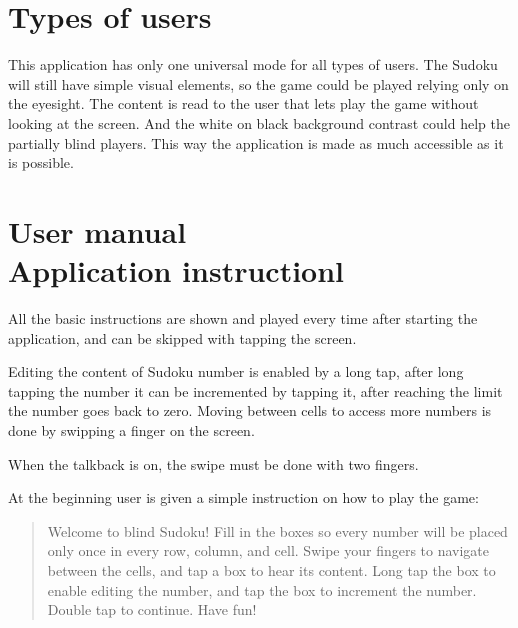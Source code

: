 \documentclass[a4paper,twoside,12pt]{book}
\begin{document}
\section{Types of users}

\par This application has only one universal mode for all types of users. The Sudoku will still have simple visual elements, so the game could be played relying only on the eyesight. The content is read to the user that lets play the game without looking at the screen. And the white on black background contrast could help the partially blind players. This way the application is made as much accessible as it is possible.

\section{User manual\\{\large Application instruction}l}

\par 
All the basic instructions are shown and played every time after starting the application, and can be skipped with tapping the screen. 
\par
Editing the content of Sudoku number is enabled by a long tap, after long tapping the number it can be incremented by tapping it, after reaching the limit the number goes back to zero. Moving between cells to access more numbers is done by swipping a finger on the screen.
\par
When the talkback is on, the swipe must be done with two fingers.
\par 
At the beginning user is given a simple instruction on how to play the game:
\begin{quote}
Welcome to blind Sudoku!
Fill in the boxes so every number will be placed only
once in every row, column, and cell. Swipe your fingers to navigate between the cells,
and tap a box to hear its content. Long tap the box to enable editing the number, and tap
the box to increment the number. Double tap to continue. Have fun!
\end{quote}


\end{document}
